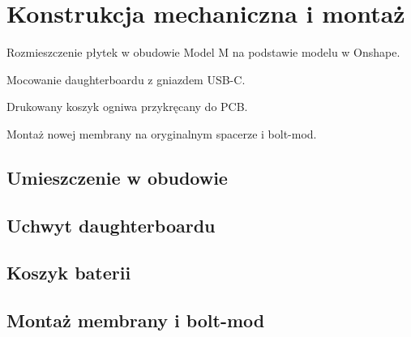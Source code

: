 \chapter{Konstrukcja mechaniczna i montaż}\label{ch:mechanika}
\begin{zawartosc}
  \item Rozmieszczenie płytek w obudowie Model M na podstawie modelu w Onshape.
  \item Mocowanie daughterboardu z gniazdem USB-C.
  \item Drukowany koszyk ogniwa przykręcany do PCB.
  \item Montaż nowej membrany na oryginalnym spacerze i bolt-mod.
\end{zawartosc}

\section{Umieszczenie w obudowie}\label{sec:obudowa}

\section{Uchwyt daughterboardu}\label{sec:uchwytdb}

\section{Koszyk baterii}\label{sec:koszyk}

\section{Montaż membrany i bolt-mod}\label{sec:boltmod}

